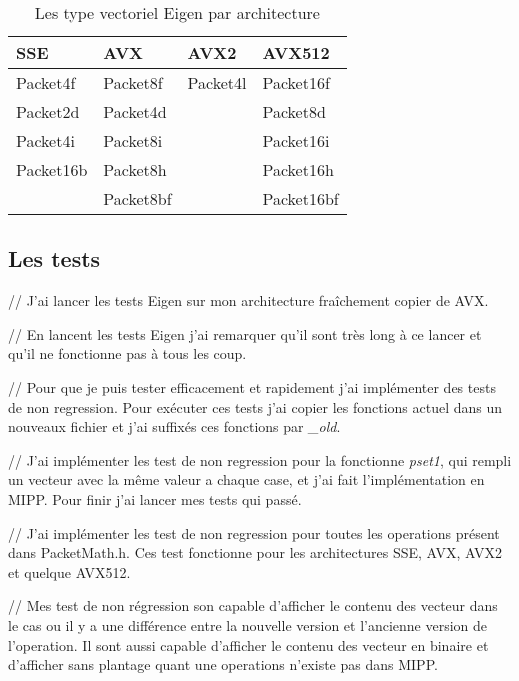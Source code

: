\begin{table}[H]
  \centering
  \begin{tabular}[H]{|l|l|l|l|}
    \hline
    \textbf{SSE} & \textbf{AVX} & \textbf{AVX2} & \textbf{AVX512} \\
    \hline
    Packet4f     & Packet8f     & Packet4l      & Packet16f       \\
    \hline
    Packet2d     & Packet4d     &               & Packet8d        \\
    \hline
    Packet4i     & Packet8i     &               & Packet16i       \\
    \hline
    Packet16b    & Packet8h     &               & Packet16h       \\
    \hline
                 & Packet8bf    &               & Packet16bf      \\
    \hline
  \end{tabular}
  \caption{Les type vectoriel Eigen par architecture}
\end{table}


\subsection{Les tests}

// J'ai lancer les tests Eigen sur mon architecture fraîchement copier de AVX.

// En lancent les tests Eigen j'ai remarquer qu'il sont très long à ce lancer et qu'il
ne fonctionne pas à tous les coup.

// Pour que je puis tester efficacement et rapidement j'ai implémenter des tests de non
regression. Pour exécuter ces tests j'ai copier les fonctions actuel dans un nouveaux
fichier et j'ai suffixés ces fonctions par \emph{_old}.

// J'ai implémenter les test de non regression pour la fonctionne \emph{pset1}, qui
rempli un vecteur avec la même valeur a chaque case, et j'ai fait l'implémentation en
MIPP. Pour finir j'ai lancer mes tests qui passé.

// J'ai implémenter les test de non regression pour toutes les operations présent dans
PacketMath.h. Ces test fonctionne pour les architectures SSE, AVX, AVX2 et quelque AVX512.

// Mes test de non régression son capable d'afficher le contenu des vecteur dans le cas
ou il y a une différence entre la nouvelle version et l'ancienne version de l'operation.
Il sont aussi capable d'afficher le contenu des vecteur en binaire et d'afficher sans
plantage quant une operations n'existe pas dans MIPP.

